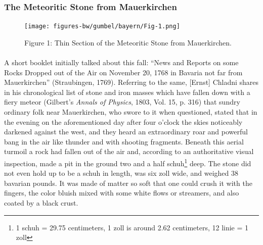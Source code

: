 \documentclass[a4paper, 12pt, oneside]{article}
\begin{document}
\subsubsection{The Meteoritic Stone from Mauerkirchen}
\begin{figure}[h]
\centering
\texttt{[image: figures-bw/gumbel/bayern/Fig-1.png]}
\caption{Figure 1: Thin Section of the Meteoritic Stone from Mauerkirchen.}
\end{figure}
\paragraph*{}
A short booklet initially talked about this fall: ``News and Reports on some Rocks Dropped out of the Air on November 20, 1768 in Bavaria not far from Mauerkirchen'' (Straubingen, 1769). Referring to the same, [Ernst] Chladni shares in his chronological list of stone and iron masses which have fallen down with a fiery meteor (Gilbert's \emph{Annals of Physics}, 1803, Vol. 15, p. 316) that sundry ordinary folk near Mauerkirchen, who swore to it when questioned, stated that in the evening on the aforementioned day after four o'clock the skies noticeably darkened against the west, and they heard an extraordinary roar and powerful bang in the air like thunder and with shooting fragments. Beneath this aerial turmoil a rock had fallen out of the air and, according to an authoritative visual inspection, made a pit in the ground two and a half schuh\footnote{1 schuh = 29.75 centimeters, 1 zoll is around 2.62 centimeters, 12 linie = 1 zoll} deep. The stone did not even hold up to be a schuh in length, was six zoll wide, and weighed 38 bavarian pounds. It was made of matter so soft that one could crush it with the fingers, the color bluish mixed with some white flows or streamers, and also coated by a black crust.
\end{document}
